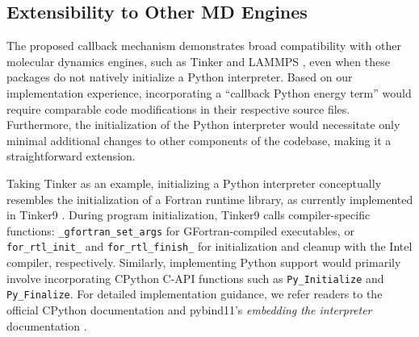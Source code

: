 \subsection{Extensibility to Other MD Engines}

The proposed callback mechanism demonstrates broad compatibility
with other molecular dynamics engines,
such as Tinker \cite{Rackers2018} and LAMMPS \cite{Thompson2022},
even when these packages do not natively initialize a Python interpreter.
Based on our implementation experience,
incorporating a ``callback Python energy term''
would require comparable code modifications
in their respective source files.
Furthermore, the initialization of the Python interpreter would necessitate
only minimal additional changes to other components of the codebase,
making it a straightforward extension.

Taking Tinker as an example,
initializing a Python interpreter conceptually resembles
the initialization of a Fortran runtime library,
as currently implemented in Tinker9 \cite{Software-Tinker9}.
During program initialization, Tinker9 calls compiler-specific functions:
\verb|_gfortran_set_args| for GFortran-compiled executables,
or \verb|for_rtl_init_| and \verb|for_rtl_finish_|
for initialization and cleanup with the Intel compiler, respectively.
Similarly, implementing Python support would primarily involve
incorporating CPython C-API functions
such as \verb|Py_Initialize| and \verb|Py_Finalize|.
For detailed implementation guidance,
we refer readers to the official CPython documentation \cite{Software-Python-C-API}
and pybind11's \emph{embedding the interpreter} documentation \cite{Software-pybind11-embed}.
